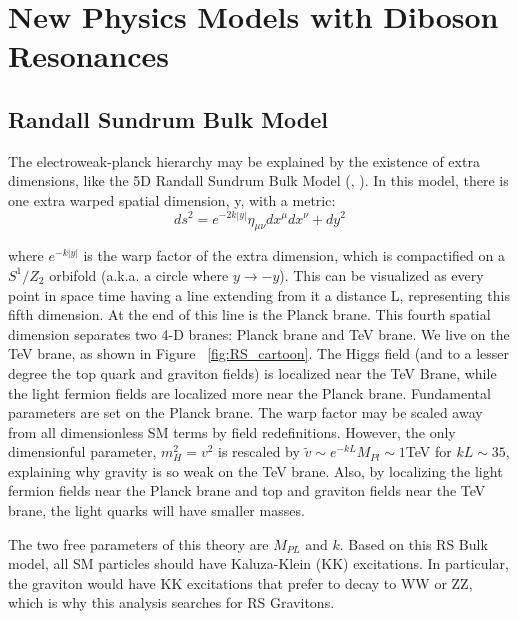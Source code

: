 \chapter{New Physics Models with Diboson Resonances}
\label{BSM chapter}

\section{Randall Sundrum Bulk Model}
The electroweak-planck hierarchy may be explained by the existence of extra dimensions, like the 5D Randall Sundrum Bulk Model (\cite{rs1}, \cite{rs2}). In this model, there is one extra warped spatial dimension, y, with a metric:
\begin{equation}
ds^{2}=e^{-2k|y|}\eta_{\mu\nu}dx^{\mu}dx^{\nu}+dy^{2} 
\end{equation}

where $e^{-k|y|}$ is the warp factor of the extra dimension, which is compactified on a $S^{1}/Z_{2}$ orbifold (a.k.a. a circle where $y \rightarrow -y$). This can be visualized as every point in space time having a line extending from it a distance L, representing this fifth dimension. At the end of this line is the Planck brane. This fourth spatial dimension separates two 4-D branes: Planck brane and TeV brane. We live on the TeV brane, as shown in Figure ~\ref{fig:RS_cartoon}. The Higgs field (and to a lesser degree the top quark and graviton fields) is localized near the TeV Brane, while the light fermion fields are localized more near the Planck brane. Fundamental parameters are set on the Planck brane. The warp factor may be scaled away from all dimensionless SM terms by field redefinitions. However, the only dimensionful parameter, $m_{H}^{2}=v^{2}$ is rescaled by $\tilde{v}\sim e^{-kL}M_{Pl}\sim 1$TeV for $kL\sim 35$, explaining why gravity is so weak on the TeV brane. Also, by localizing the light fermion fields near the Planck brane and top and graviton fields near the TeV brane, the light quarks will have smaller masses. 

The two free parameters of this theory are $M_{PL}$ and $k$. Based on this RS Bulk model, all SM particles should have Kaluza-Klein (KK) excitations. In particular, the graviton would have KK excitations that prefer to decay to WW or ZZ, which is why this analysis searches for RS Gravitons. 


